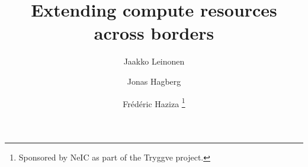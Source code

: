 
\title{Extending compute resources across borders}

\author{%
Jaakko Leinonen
\and %
Jonas Hagberg %
\and %
Fr\'ed\'eric Haziza %
\thanks{Sponsored by NeIC as part of the Tryggve project.}
}


